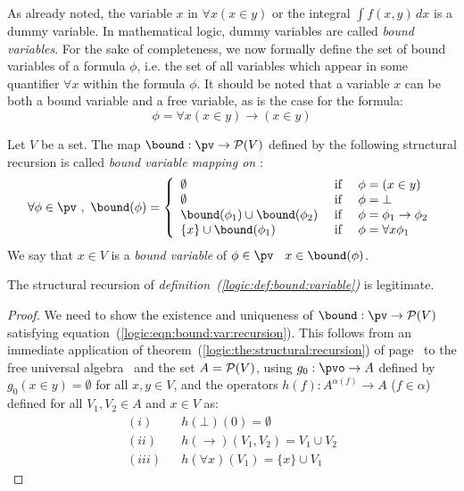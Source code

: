 As already noted, the variable $x$ in $\forall x(x\in y)$ or the
integral $\int\! f(x,y)\,dx$ is a dummy variable. In mathematical
logic, dummy variables are called {\em bound variables}. For the
sake of completeness, we now formally define the set of bound
variables of a formula $\phi$, i.e. the set of all variables which
appear in some quantifier $\forall x$ within the formula $\phi$. It
should be noted that a variable $x$ can be both a bound variable and
a free variable, as is the case for the formula:
    \[
    \phi=\forall x(x\in y)\to (x\in y)
    \]
\begin{defin}\label{logic:def:bound:variable}
    Let $V$ be a set. The map $\bound:\pv\to {\cal P}(V)$ defined by the
    following structural recursion is called {\em bound variable mapping on \pv}:
    \begin{equation}\label{logic:eqn:bound:var:recursion}
        \forall\phi\in\pv\ ,\ \bound(\phi)=
            \left\{\begin{array}{lcl}
                \emptyset&\mbox{\ if\ }&\phi=(x\in y)
                \\
                \emptyset&\mbox{\ if\ }&\phi=\bot
                \\
                \bound(\phi_{1})\cup\bound(\phi_{2}) 
                    &\mbox{\ if\ }&
                \phi=\phi_{1}\to\phi_{2}
                \\
                \{x\}\cup\bound(\phi_{1})&\mbox{\ if\ }&\phi=\forall x\phi_{1}
            \end{array}\right.
    \end{equation}
    We say that $x\in V$ is a {\em bound variable} of $\phi\in\pv$ \ifand\ 
    $x\in\bound(\phi)$.
\end{defin}
\begin{prop}\label{logic:prop:bound:variable}
    The structural recursion of {\em definition~(\ref{logic:def:bound:variable})} 
    is legitimate.
\end{prop}
\begin{proof}
We need to show the existence and uniqueness of $\bound:\pv\to{\cal
P}(V)$ satisfying equation~(\ref{logic:eqn:bound:var:recursion}).
This follows from an immediate application of
theorem~(\ref{logic:the:structural:recursion}) of
page~\pageref{logic:the:structural:recursion} to the free universal
algebra \pv\ and the set $A={\cal P}(V)$, using $g_{0}:\pvo\to A$
defined by $g_{0}(x\in y)=\emptyset$ for all $x,y\in V$, and the
operators $h(f):A^{\alpha(f)}\to A$ ($f\in\alpha$) defined for all
$V_{1},V_{2}\in A$ and $x\in V$ as:
    \begin{eqnarray*}
    (i)&&h(\bot)(0)=\emptyset\\
    (ii)&&h(\to)(V_{1},V_{2})=V_{1}\cup V_{2}\\
    (iii)&&h(\forall x)(V_{1})=\{x\}\cup V_{1}
    \end{eqnarray*}
\end{proof}

